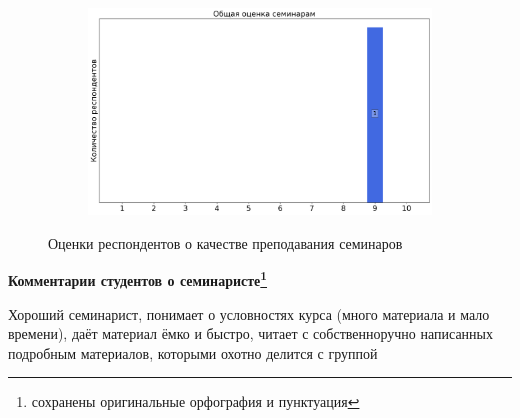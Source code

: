 \begin{figure}[H]
\begin{subfigure}[b]{0.45\textwidth}
			\end{subfigure}
			\begin{subfigure}[b]{0.45\textwidth}
				\centering
				\includegraphics[width=\textwidth]{images/4 course/Квантовая механика/seminarists-marks-Лущевская Е.В.-3.png}
			\end{subfigure}	
			\caption{Оценки респондентов о качестве преподавания семинаров}
		\end{figure}

		\textbf{Комментарии студентов о семинаристе\protect\footnote{сохранены оригинальные орфография и пунктуация}}
            \begin{commentbox} 
                Хороший семинарист, понимает о условностях курса (много материала и мало времени), даёт материал ёмко и быстро, читает с собственноручно написанных подробным материалов, которыми охотно делится с группой 
            \end{commentbox} 

